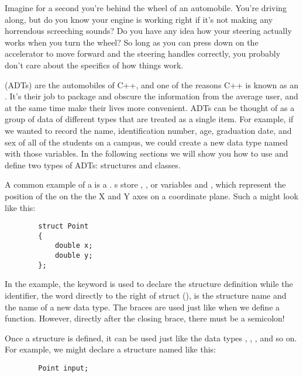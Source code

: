 


Imagine for a second you're behind the wheel of an automobile. 
You're driving along, but do you know your engine is working right if it's not making any horrendous screeching sounds? 
Do you have any idea how your steering actually works when you turn the wheel? 
So long as you can press down on the accelerator to move forward and the steering handles correctly, you probably don't care about the specifics of how things work.

 (ADTs) are the automobiles of C++, and one of the reasons C++ is known as an . 
It's their job to package and obscure the information from the average user, and at the same time make their lives more convenient.
ADTs can be thought of as a group of data of different types that are treated as a single item.
For example, if we wanted to record the name, identification number, age, graduation date, and sex of all of the students on a campus, we could create a new data type named  with those variables.
In the following sections we will show you how to use and define two types of ADTs: structures and classes. 



A common example of a  is a . s store , , or  variables  and , which represent the position of the  on the the X and Y axes on a coordinate plane. 
Such a  might look like this:

\begin{lstlisting}
		struct Point
		{
			double x;
			double y;
		};
\end{lstlisting}

In the example, the keyword  is used to declare the structure definition while the identifier, the word directly to the right of struct (), is the structure name and the name of a new data type.
The braces are used just like when we define a function.
However, directly after the closing brace, there must be a semicolon!

Once a structure is defined, it can be used just like the data types , , , and so on. 
For example, we might declare a  structure named  like this:

\begin{lstlisting}
		Point input;
\end{lstlisting}

